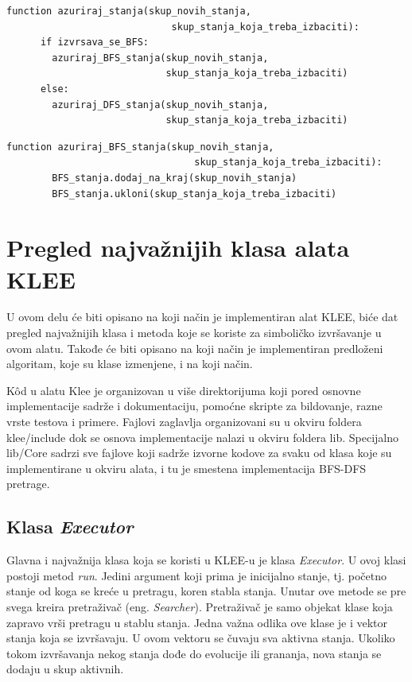 \documentclass[12pt,oneside]{memoir}
\begin{document}
    \begin{lstlisting}[caption={Pseudo k\^od funkcije za azuriranje stanja},captionpos=b,label={lst:azuriraj_stanja}]
    function azuriraj_stanja(skup_novih_stanja, 
                             skup_stanja_koja_treba_izbaciti):
      if izvrsava_se_BFS:
        azuriraj_BFS_stanja(skup_novih_stanja, 
                            skup_stanja_koja_treba_izbaciti)
      else:
        azuriraj_DFS_stanja(skup_novih_stanja, 
                            skup_stanja_koja_treba_izbaciti)
    \end{lstlisting}
    
    \begin{lstlisting}[caption={Pseudo k\^od funkcije za ažuriranje BFS stanja},captionpos=b,label={lst:azuriraj_BFS}]
    function azuriraj_BFS_stanja(skup_novih_stanja, 
                                 skup_stanja_koja_treba_izbaciti):
        BFS_stanja.dodaj_na_kraj(skup_novih_stanja)
        BFS_stanja.ukloni(skup_stanja_koja_treba_izbaciti)
    \end{lstlisting}
    
\section{Pregled najvažnijih klasa alata KLEE}
U ovom delu će biti opisano na koji način je implementiran alat KLEE, biće dat pregled najvažnijih klasa i metoda koje se koriste za simboličko izvršavanje u ovom alatu. Takođe će biti opisano na koji način je implementiran predloženi algoritam, koje su klase izmenjene, i na koji način.

K\^od u alatu Klee je organizovan u više direktorijuma koji pored osnovne implementacije sadrže i dokumentaciju, pomoćne skripte za bildovanje, razne vrste testova i primere. Fajlovi zaglavlja organizovani su u okviru foldera klee/include dok se osnova implementacije nalazi u okviru foldera lib. Specijalno lib/Core sadrzi sve fajlove koji sadrže izvorne kodove za svaku od klasa koje su implementirane u okviru alata, i tu je smestena implementacija BFS-DFS pretrage.

\subsection{Klasa \textit{Executor}}
Glavna i najvažnija klasa koja se koristi u KLEE-u je klasa \textit{Executor}. U ovoj klasi postoji metod \textit{run}. Jedini argument koji prima je inicijalno stanje, tj. početno stanje od koga se kreće u pretragu, koren stabla stanja. Unutar ove metode se pre svega kreira pretraživač (eng. \textit{Searcher}). 
Pretraživač je samo objekat klase koja zapravo vrši pretragu u stablu stanja. Jedna važna odlika ove klase je i vektor stanja koja se izvršavaju. U ovom vektoru se čuvaju sva aktivna stanja. Ukoliko tokom izvršavanja nekog stanja dođe do evolucije ili grananja, nova stanja se dodaju u skup aktivnih.
\end{document}
